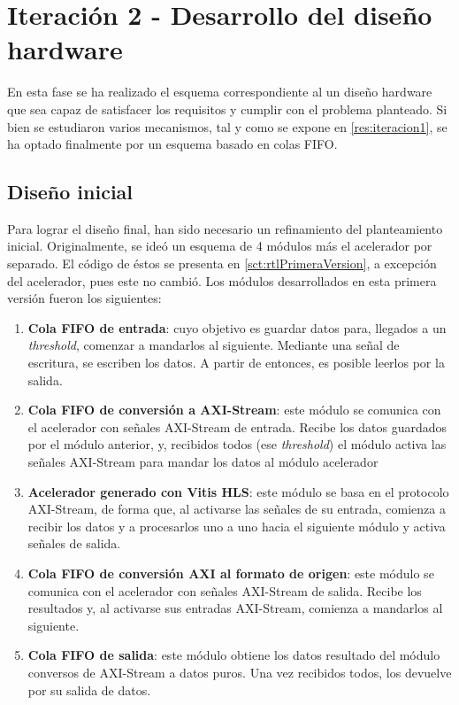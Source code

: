 \section{Iteración 2 - Desarrollo del diseño hardware}

En esta fase se ha realizado el esquema correspondiente al un diseño hardware que sea capaz de satisfacer los requisitos y cumplir con el problema planteado. Si bien se estudiaron varios mecanismos, tal y como se expone en \ref{res:iteracion1}, se ha optado finalmente por un esquema basado en colas FIFO. 

\subsection{Diseño inicial}

Para lograr el diseño final, han sido necesario un refinamiento del planteamiento inicial. Originalmente, se ideó un esquema de 4 módulos más el acelerador por separado. El código de éstos se presenta en \ref{sct:rtlPrimeraVersion}, a excepción del acelerador, pues este no cambió. Los módulos desarrollados en esta primera versión fueron los siguientes:

\begin{enumerate}
    \item \textbf{Cola FIFO de entrada}: cuyo objetivo es guardar datos para, llegados a un \textit{threshold}, comenzar a mandarlos al siguiente. Mediante una señal de escritura, se escriben los datos. A partir de entonces, es posible leerlos por la salida.
    \item \textbf{Cola FIFO de conversión a AXI-Stream}: este módulo se comunica con el acelerador con señales AXI-Stream de entrada. Recibe los datos guardados por el módulo anterior, y, recibidos todos (ese \textit{threshold}) el módulo activa las señales AXI-Stream para mandar los datos al módulo acelerador
    \item \textbf{Acelerador generado con Vitis HLS}: este módulo se basa en el protocolo AXI-Stream, de forma que, al activarse las señales de su entrada, comienza a recibir los datos y a procesarlos uno a uno hacia el siguiente módulo y activa señales de salida.
    \item \textbf{Cola FIFO de conversión AXI al formato de origen}: este módulo se comunica con el acelerador con señales AXI-Stream de salida. Recibe los resultados y, al activarse sus entradas AXI-Stream, comienza a mandarlos al siguiente.
    \item \textbf{Cola FIFO de salida}: este módulo obtiene los datos resultado del módulo conversos de AXI-Stream a datos puros. Una vez recibidos todos, los devuelve por su salida de datos.
\end{enumerate}

